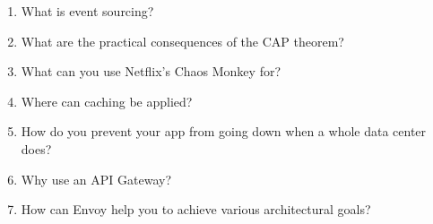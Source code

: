 \begin{enumerate}
\item
What is event sourcing?

\item 
What are the practical consequences of the CAP theorem?

\item 
What can you use Netflix's Chaos Monkey for?

\item 
Where can caching be applied?

\item 
How do you prevent your app from going down when a whole data center does?

\item 
Why use an API Gateway?

\item How can Envoy help you to achieve various architectural goals?	
\end{enumerate}